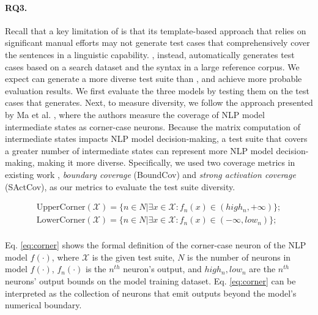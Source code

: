 \paragraph{RQ3.}
Recall that a key limitation of \Cklst is that its template-based
approach that relies on significant manual efforts may not generate
test cases that comprehensively cover the sentences in a linguistic
capability. \tool, instead, automatically generates test cases based
on a search dataset and the syntax in a large reference corpus.  We
expect \tool can generate a more diverse test suite than \Cklst, and
achieve more probable evaluation results. We first evaluate the three
\sa models by testing them on the test cases that \tool
generates. Next, to measure diversity, we follow the approach
presented by Ma et al. \cite{ma2018deepgauge}, where the authors
measure the coverage of NLP model intermediate states as corner-case
neurons.  Because the matrix computation of intermediate states
impacts NLP model decision-making, a test suite that covers a greater
number of intermediate states can represent more NLP model
decision-making, making it more diverse.  Specifically, we used two
coverage metrics in existing work \cite{ma2018deepgauge},
\textit{boundary coverage} (BoundCov) and \textit{strong activation
  coverage} (SActCov), as our metrics to evaluate the test suite
diversity.  


\begin{equation}
\begin{split}
    \text{UpperCorner}(\mathcal{X}) = \{n \in N | \exists x \in \mathcal{X}: f_n(x) \in (high_n, +\infty)\}; \\
    \text{LowerCorner}(\mathcal{X}) = \{n \in N | \exists x \in \mathcal{X}: f_n(x) \in (-\infty, low_n)\}; \\
\end{split}
    \label{eq:corner}
\end{equation}

\noindent Eq. \ref{eq:corner} shows the formal definition of the
corner-case neuron of the NLP model $f(\cdot)$, where $\mathcal{X}$ is
the given test suite, $N$ is the number of neurons in model
$f(\cdot)$, $f_n(\cdot)$ is the $n^{th}$ neuron's output, and $high_n,
low_n$ are the $n^{th}$ neurons' output bounds on the model training
dataset.  Eq. \ref{eq:corner} can be interpreted as the collection of
neurons that emit outputs beyond the model's numerical boundary.

